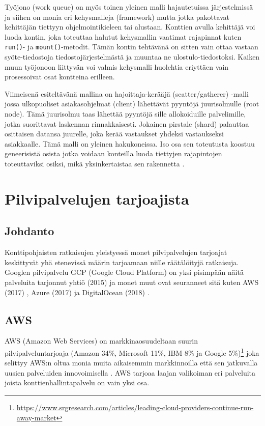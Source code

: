 \documentclass[finnish]{tktltiki2}
\theoremstyle{definition}
\theoremstyle{remark}
\begin{document}
Työjono (work queue) on myös toinen yleinen malli hajautetuissa järjestelmissä ja siihen on monia eri kehysmalleja (framework) mutta jotka pakottavat kehittäjän tiettyyn ohjelmointikieleen tai alustaan. Konttien avulla kehittäjä voi luoda kontin, joka toteuttaa halutut kehysmallin vaatimat rajapinnat kuten \texttt{run()}- ja \texttt{mount()}-metodit. Tämän kontin tehtävänä on sitten vain ottaa vastaan syöte-tiedostoja tiedostojärjestelmästä ja muuntaa ne ulostulo-tiedostoksi. Kaiken muun työjonoon liittyvän voi valmis kehysmalli huolehtia eriyttäen vain prosessoivat osat kontteina erilleen.

Viimeisenä esiteltävänä mallina on hajoittaja-kerääjä (scatter/gatherer) -malli jossa ulkopuoliset asiakasohjelmat (client) lähettävät pyyntöjä juurisolmulle (root node). Tämä juurisolmu taas lähettää pyyntöjä sille allokoiduille palvelimille, jotka suorittavat laskennan rinnakkaisesti. Jokainen pirstale (shard) palauttaa osittaisen datansa juurelle, joka kerää vastaukset yhdeksi vastaukseksi asiakkaalle. Tämä malli on yleinen hakukoneissa. Iso osa sen toteutusta koostuu geneerisistä osista jotka voidaan konteilla luoda tiettyjen rajapintojen toteuttaviksi osiksi, mikä yksinkertaistaa sen rakennetta \cite{container-design-patterns}.

\section{Pilvipalvelujen tarjoajista}

\subsection{Johdanto}

Konttipohjaisten ratkaisujen yleistyessä monet pilvipalvelujen tarjoajat keskittyvät yhä etenevissä määrin tarjoamaan niille räätälöityjä ratkaisuja. Googlen pilvipalvelu GCP (Google Cloud Platform) on yksi pisimpään näitä palveluita tarjonnut yhtiö (2015) \cite{gcp-kubernetes} ja monet muut ovat seuranneet sitä kuten AWS (2017) \cite{aws-kubernetes}, Azure (2017) \cite{azure-kubernetes} ja DigitalOcean (2018) \cite{digital-ocean-kubernetes}.

\subsection{AWS}
\label{ch:aws}

AWS (Amazon Web Services) on markkinaosuudeltaan suurin pilvipalveluntarjoaja (Amazon 34\%, Microsoft 11\%, IBM 8\% ja Google 5\%)\footnote{\url{https://www.srgresearch.com/articles/leading-cloud-providers-continue-run-away-market}} joka selittyy AWS:n oltua monia muita aikaisemmin markkinnoilla että sen jatkuvalla uusien palveluiden innovoimisella \cite{aws-leading-cloud}. AWS tarjoaa laajan valikoiman eri palveluita joista konttienhallintapalvelu on vain yksi osa.
\end{document}
